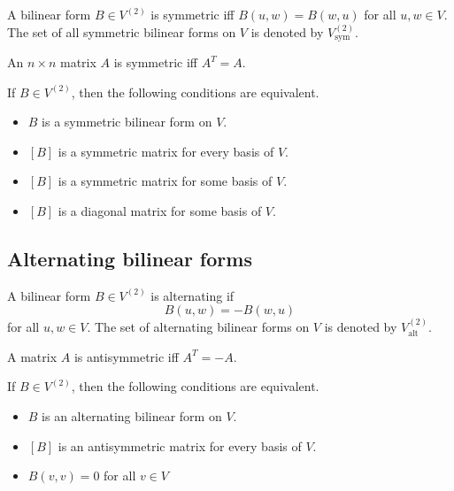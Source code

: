 \begin{definition}
  A bilinear form $B \in V^{(2)}$ is symmetric iff $B(u, w) = B(w, u)$ for all $u, w \in V$. The set of all symmetric bilinear forms on $V$ is denoted by $V^{(2)}_{\text{sym}}$.
\end{definition}

\begin{definition}
  An $n \times n$ matrix $A$ is symmetric iff $A^T = A$.
\end{definition}

\begin{theorem}
  If $B \in V^{(2)}$, then the following conditions are equivalent.
  \begin{itemize}
    \item $B$ is a symmetric bilinear form on $V$.
    \item $[B]$ is a symmetric matrix for every basis of $V$.
    \item $[B]$ is a symmetric matrix for some basis of $V$.
    \item $[B]$ is a diagonal matrix for some basis of $V$.
  \end{itemize}
\end{theorem}

\subsection{Alternating bilinear forms}

\begin{definition}
  A bilinear form $B \in V^{(2)}$ is alternating if
  \[
    B(u, w) = -B(w, u)
  \]
  for all $u, w \in V$. The set of alternating bilinear forms on $V$ is denoted by $V^{(2)}_{\text{alt}}$.
\end{definition}

\begin{definition}
  A matrix $A$ is antisymmetric iff $A^T = -A$.
\end{definition}

\begin{theorem}
  If $B \in V^{(2)}$, then the following conditions are equivalent.
  \begin{itemize}
    \item $B$ is an alternating bilinear form on $V$.
    \item $[B]$ is an antisymmetric matrix for every basis of $V$.
    \item $B(v, v) = 0$ for all $v \in V$
  \end{itemize}
\end{theorem}

